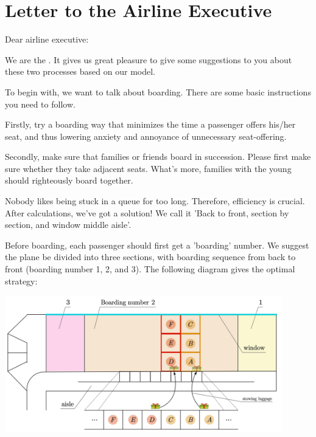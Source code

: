 \documentclass{article}
\theoremstyle{definition}
\theoremstyle{remark}
\numberwithin{equation}{section}
\begin{document}
	\newpage
	\section{Letter to the Airline Executive}
	\noindent Dear airline executive:

	We are the .  It gives us great pleasure to give some suggestions to you about these two processes based on our model.

	To begin with, we want to talk about boarding. There are some basic instructions you need to follow.

	\begin{itemize}

		Firstly, try a boarding way that minimizes the time a passenger offers his/her seat, and thus lowering anxiety and annoyance of unnecessary seat-offering.

  		Secondly, make sure that families or friends board in succession. Please first make sure whether they take adjacent seats. What's more, families with the young should righteously board together.

		Nobody likes being stuck in a queue for too long. Therefore, efficiency  is crucial. After calculations, we've got a solution! We call it 'Back to front, section by section, and window middle aisle'.

		Before boarding, each passenger should first get a 'boarding' number. We suggest the plane be divided into three sections, with boarding sequence from back to front (boarding number 1, 2, and 3).  The following diagram gives the optimal strategy:
		\begin{center}
			\includegraphics[width=12cm]{advic.jpg}
		\end{center}
	\end{itemize}
\end{document}
